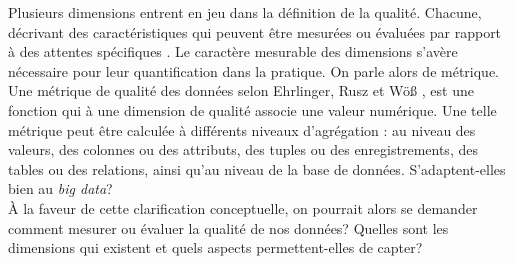 Plusieurs dimensions entrent en jeu dans la définition de la qualité. Chacune, décrivant des caractéristiques qui peuvent être mesurées ou évaluées par rapport à des attentes spécifiques \cite{dama}. Le caract\`ere mesurable des dimensions s'av\`ere nécessaire pour leur quantification dans la pratique. On parle alors de m\'etrique. Une métrique de qualit\'e des donn\'ees selon Ehrlinger, Rusz et Wöß \cite{ehrlinger2019survey}, est une fonction qui \`a une dimension de qualité associe une valeur numérique. Une telle métrique peut être calcul\'ee à différents niveaux d'agrégation : au niveau des valeurs, des colonnes ou des attributs, des tuples ou des enregistrements, des tables ou des relations, ainsi qu'au niveau de la base de données. S'adaptent-elles bien au \textit{big data}?
\\

\`A la faveur de cette clarification conceptuelle, on pourrait alors se demander comment mesurer ou \'evaluer la qualit\'e de nos donn\'ees? Quelles sont les dimensions qui existent et quels aspects permettent-elles de capter?



